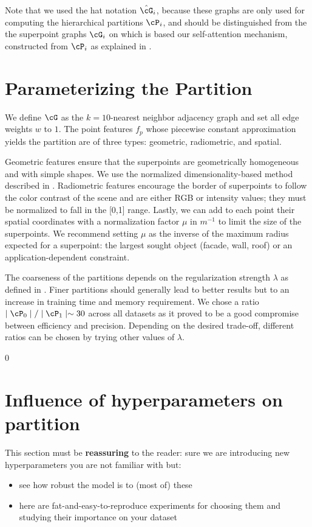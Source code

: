 Note that we used the hat notation $\hat{\cG}_i$, because these graphs are only used for computing the hierarchical partitions $\cP_i$, and should be distinguished from the the superpoint graphs $\cG_i$ on which is based our self-attention mechanism, constructed from $\cP_i$ as explained in .


\section{Parameterizing the Partition}
\label{sec:hyper}
We define $\cG$ as the $k=10$-nearest neighbor adjacency graph and set all edge weights $w$ to $1$. The point features $f_p$ whose piecewise constant approximation yields the partition are of three types: geometric, radiometric, and spatial.

Geometric features ensure that the superpoints are geometrically homogeneous and with simple shapes. We use the normalized dimensionality-based method described in . Radiometric features encourage the border of superpoints to follow the color contrast of the scene and are either RGB or intensity values; they must be normalized to fall in the [0,1] range. Lastly, we can add to each point their spatial coordinates with a normalization factor $\mu$ in $m^{-1}$ to limit the size of the superpoints. We recommend setting $\mu$ as the inverse of the maximum radius expected for a superpoint: the largest sought object (facade, wall, roof) or an application-dependent constraint.

The coarseness of the partitions depends on the regularization strength $\lambda$ as defined in .
Finer partitions should generally lead to better results but to an increase in training time and memory requirement. We chose a ratio $\mid \cP_0 \mid / \mid \cP_1\mid \sim 30$ across all datasets as it proved to be a good compromise between efficiency and precision. Depending on the desired trade-off, different ratios can be chosen by trying other values of $\lambda$.

 
 0
\section{Influence of hyperparameters on partition}
This section must be \textbf{reassuring} to the reader: sure we are introducing new hyperparameters you are not familiar with but:
\begin{itemize}
    \item see how robust the model is to (most of) these
    \item here are fat-and-easy-to-reproduce experiments for choosing them and studying their importance on your dataset
\end{itemize}

